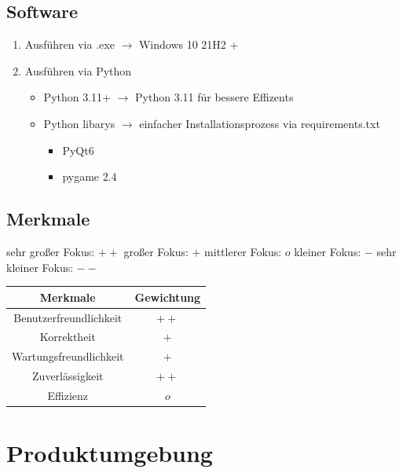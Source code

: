 \documentclass{article}
\begin{document}
\subsection{Software}
\begin{enumerate}
    \item Ausführen via .exe $\rightarrow$ Windows 10 21H2 +
    \item Ausführen via Python
        \begin{itemize}
            \item Python 3.11+ $\rightarrow$ Python 3.11 für bessere Effizents
            \item Python libarys $\rightarrow$ einfacher Installationsprozess via requirements.txt
                \begin{itemize}
                    \item PyQt6
                    \item pygame 2.4
                \end{itemize}
        \end{itemize}
\end{enumerate}

\subsection{Merkmale}
sehr großer Fokus: $++$    großer Fokus: $+$    mittlerer Fokus: $o$    kleiner Fokus: $-$    sehr kleiner Fokus: $--$
\begin{center}
    \begin{tabular}{ |c|c| }
        \hline
        Merkmale & Gewichtung \\
        \hline
        Benutzerfreundlichkeit & $++$ \\
        \hline
        Korrektheit & $+$ \\
        \hline
        Wartungsfreundlichkeit & $+$ \\
        \hline
        Zuverlässigkeit & $++$ \\
        \hline
        Effizienz & $o$ \\
        \hline
    \end{tabular}
\end{center}



\newpage
\section{Produktumgebung}\label{section-product}
\end{document}
